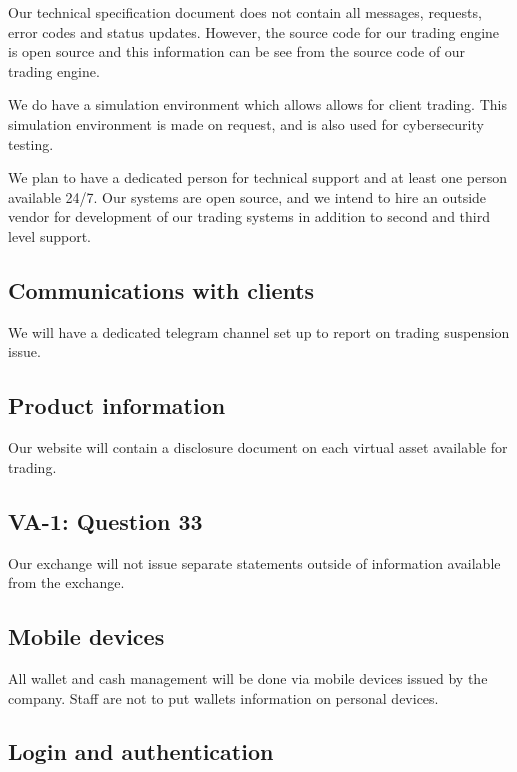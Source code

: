 Our technical specification document does not contain all messages,
requests, error codes and status updates.  However, the source code
for our trading engine is open source and this information can be see
from the source code of our trading engine.

We do have a simulation environment which allows allows for client
trading.  This simulation environment is made on request, and is also
used for cybersecurity testing.

We plan to have a dedicated person for technical support and at least
one person available 24/7.  Our systems are open source, and we intend
to hire an outside vendor for development of our trading systems in
addition to second and third level support.

\subsection{Communications with clients}
We will have a dedicated telegram channel set up to report on trading
suspension issue.

\subsection{Product information}
Our website will contain a disclosure document on each virtual asset
available for trading.

\subsection{VA-1: Question 33}
Our exchange will not issue separate statements outside of information
available from the exchange.

\subsection{Mobile devices}
All wallet and cash management will be done via mobile devices issued
by the company.  Staff are not to put wallets information on personal
devices.

\subsection{Login and authentication}

